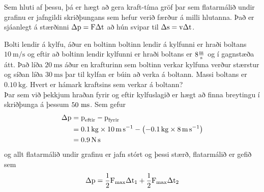 Sem hluti af þessu, þá er hægt að gera kraft-tíma gröf þar sem flatarmálið undir
grafinu er jafngildi skriðþungans sem hefur verið færður á milli hlutanna. Það
er sjáanlegt á stærðinni $\Delta\text{p} = \textrm{F} \Delta\textrm{t}$ að hún svipar
til $\Delta\textrm{s} = \textrm{v} \Delta\textrm{t}$.
\begin{formalexample}
\begin{wrapfigure}{r}{0.5\textwidth}
	\begin{center}
		\centering
	\end{center}
\end{wrapfigure}
Bolti lendir á kylfu, áður en boltinn boltinn lendir á kylfunni er hraði boltans
$\SI{10}{\m\per\s}$ og eftir að boltinn lendir kylfunni er hraði boltans er
$8 \frac{\textrm{m}}{\textrm{s}}$ og í gagnstæða átt. 
Það líða $\SI{20}{\ms}$ áður en krafturinn sem boltinn verkar
kylfuna verður stærstur og síðan líða $\SI{30}{\ms}$ þar til kylfan er búin að
verka á boltann. Massi boltans er $\SI{0.10}{\kg}$.
Hvert er hámark kraftsins sem verkar á boltann?
\\[4 ex]
Þar sem við þekkjum hraðan fyrir og eftir kylfuslagið er hægt að finna breytingu í
skriðþunga á þessum $50 \textrm{ m}\textrm{s}$. Sem gefur
\begin{align*}
	\Delta\umomentum &= \umomentum_\text{eftir} - \umomentum_\text{fyrir} \\
		&= \SI{0.1}{\kg} \times \SI{10}{\m\per\s} 
			- \left( - \SI{0.1}{\kg} \times \SI{8}{\m\per\s} \right) \\
		&= \SI{0.9}{\N\s}
\end{align*}
og allt flatarmálið undir grafinu er jafn stórt og þessi stærð, flatarmálið er gefið
sem
\begin{align*}
	\Delta\umomentum &= \frac{1}{2} \uforce_\text{max} \Delta\utime_1
		+ \frac{1}{2} \uforce_\text{max} \Delta\utime_2 \\

\end{align*}
\end{formalexample}
